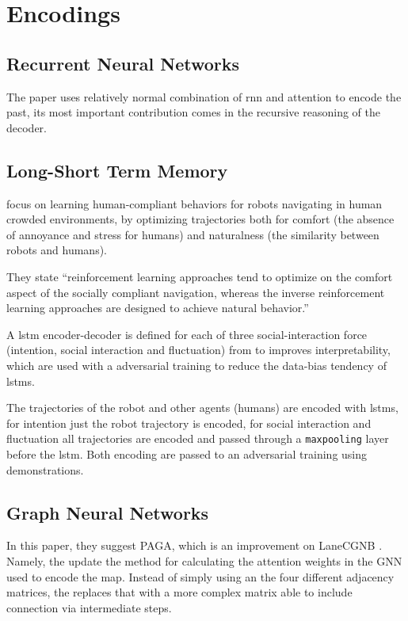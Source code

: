 \section{Encodings}\label{sec: encodings}

\subsection{Recurrent Neural Networks}

 \cite{xu2022socialvae} The paper uses relatively normal combination of rnn and attention to encode the past, its most important contribution comes in the recursive reasoning of the decoder.

\subsection{Long-Short Term Memory}

 \cite{tsai2020generative} focus on learning human-compliant behaviors for robots navigating in human crowded environments, by optimizing trajectories both for comfort (the absence of annoyance and stress for humans) and naturalness (the similarity between robots and humans).

They state ``reinforcement learning approaches tend to optimize on the comfort aspect of the socially compliant navigation, whereas the inverse reinforcement learning approaches are designed to achieve natural behavior.''

A \gls{lstm} encoder-decoder is defined for each of three social-interaction force (intention, social interaction and fluctuation) from \cite{helbing1995social} to improves interpretability, which are used with a adversarial training to reduce the data-bias tendency of \glspl{lstm}.

The trajectories of the robot and other agents (humans) are encoded with \glspl{lstm}, for intention just the robot trajectory is encoded, for social interaction and fluctuation all trajectories are encoded and passed through a \texttt{maxpooling} layer before the \gls{lstm}.
%
Both encoding are passed to an adversarial training using demonstrations.

\subsection{Graph Neural Networks}

 \cite{da2022path} In this paper, they suggest PAGA, which is an improvement on LaneCGNB \cite{liang2020learning}. Namely, the update the method for calculating the attention weights in the GNN used to encode the map. Instead of simply using an the four different adjacency matrices, the replaces that with a more complex matrix able to include connection via intermediate steps.
